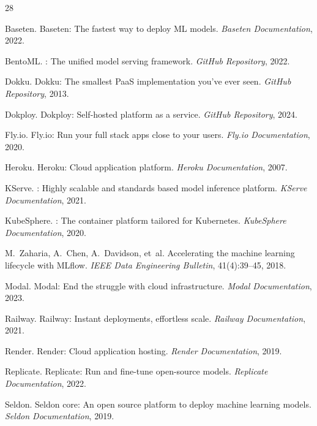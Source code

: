 \documentclass[11pt,twocolumn]{article}
\begin{document}

\begin{thebibliography}{28}

Baseten.
\newblock Baseten: The fastest way to deploy {ML} models.
\newblock \emph{Baseten Documentation}, 2022.

BentoML.
: The unified model serving framework.
\newblock \emph{GitHub Repository}, 2022.

Dokku.
\newblock Dokku: The smallest {PaaS} implementation you've ever seen.
\newblock \emph{GitHub Repository}, 2013.

Dokploy.
\newblock Dokploy: Self-hosted platform as a service.
\newblock \emph{GitHub Repository}, 2024.

Fly.io.
\newblock Fly.io: Run your full stack apps close to your users.
\newblock \emph{Fly.io Documentation}, 2020.

Heroku.
\newblock Heroku: Cloud application platform.
\newblock \emph{Heroku Documentation}, 2007.

KServe.
: Highly scalable and standards based model inference platform.
\newblock \emph{KServe Documentation}, 2021.

KubeSphere.
: The container platform tailored for {Kubernetes}.
\newblock \emph{KubeSphere Documentation}, 2020.

M.~Zaharia, A.~Chen, A.~Davidson, et~al.
\newblock Accelerating the machine learning lifecycle with {MLflow}.
\newblock \emph{IEEE Data Engineering Bulletin}, 41(4):39--45, 2018.

Modal.
\newblock Modal: End the struggle with cloud infrastructure.
\newblock \emph{Modal Documentation}, 2023.

Railway.
\newblock Railway: Instant deployments, effortless scale.
\newblock \emph{Railway Documentation}, 2021.

Render.
\newblock Render: Cloud application hosting.
\newblock \emph{Render Documentation}, 2019.

Replicate.
\newblock Replicate: Run and fine-tune open-source models.
\newblock \emph{Replicate Documentation}, 2022.

Seldon.
\newblock Seldon core: An open source platform to deploy machine learning models.
\newblock \emph{Seldon Documentation}, 2019.


\end{thebibliography}
\end{document}
